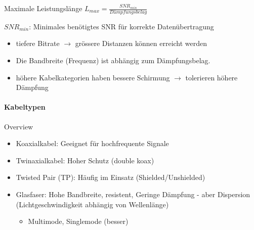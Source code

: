     \begin{concept}{Maximale Leistungslänge} $L_{max} = \frac{SNR_{min}}{Dämpfungsbelag}$

        \vspace{1mm}

        {\small $SNR_{min}$: Minimales benötigtes SNR für korrekte Datenübertragung}

        \vspace{1mm}

        \begin{itemize}
            \item tiefere Bitrate $\rightarrow$ grössere Distanzen können erreicht werden
            \item Die Bandbreite (Frequenz) ist abhängig zum Dämpfungsbelag.
            \item höhere Kabelkategorien haben bessere Schirmung $\rightarrow$ tolerieren höhere Dämpfung
        \end{itemize}
    \end{concept}

    

    \paragraph{Kabeltypen}
    \begin{concept}{Overview}
        \begin{itemize}
            \item Koaxialkabel: Geeignet für hochfrequente Signale
            \item Twinaxialkabel: Hoher Schutz (double koax)
            \item Twisted Pair (TP): Häufig im Einsatz (Shielded/Unshielded)
            \item Glasfaser: Hohe Bandbreite, resistent, Geringe Dämpfung - aber Dispersion (Lichtgeschwindigkeit abhängig von Wellenlänge)
                \begin{itemize}
                    \item Multimode, Singlemode (besser)
                \end{itemize}
        \end{itemize}        
    \end{concept}

